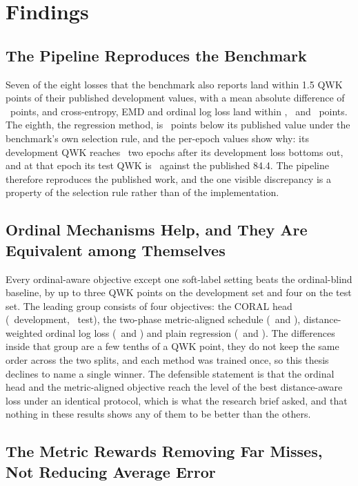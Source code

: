 \section{Findings}

\subsection{The Pipeline Reproduces the Benchmark}

Seven of the eight losses that the benchmark also reports land within 1.5 QWK points of their
published development values, with a mean absolute difference of \gapQwkMean\ points, and
cross-entropy, EMD and ordinal log loss land within \gapQwkCE, \gapQwkEMD\ and \gapQwkOLL\
points. The eighth, the regression method, is \gapQwkMSE\ points below its published value under
the benchmark's own selection rule, and the per-epoch values show why: its development QWK
reaches \qwkseldevQwkMSE\ two epochs after its development loss bottoms out, and at that epoch
its test QWK is \qwkseltestQwkMSE\ against the published 84.4. The pipeline therefore
reproduces the published work, and the one visible discrepancy is a property of the selection
rule rather than of the implementation.

\subsection{Ordinal Mechanisms Help, and They Are Equivalent among Themselves}

Every ordinal-aware objective except one soft-label setting beats the ordinal-blind baseline,
by up to three QWK points on the development set and four on the test set. The leading group
consists of four objectives: the CORAL head (\devQwkCoral\ development, \testQwkCoral\ test),
the two-phase metric-aligned schedule (\devQwkSoftqwk\ and \testQwkSoftqwk), distance-weighted
ordinal log loss (\devQwkOLL\ and \testQwkOLL) and plain regression (\devQwkMSE\ and
\testQwkMSE). The differences inside that group are a few tenths of a QWK point, they do not
keep the same order across the two splits, and each method was trained once, so this thesis
declines to name a single winner. The defensible statement is that the ordinal head and the
metric-aligned objective reach the level of the best distance-aware loss under an identical
protocol, which is what the research brief asked, and that nothing in these results shows any
of them to be better than the others.

\subsection{The Metric Rewards Removing Far Misses, Not Reducing Average Error}

